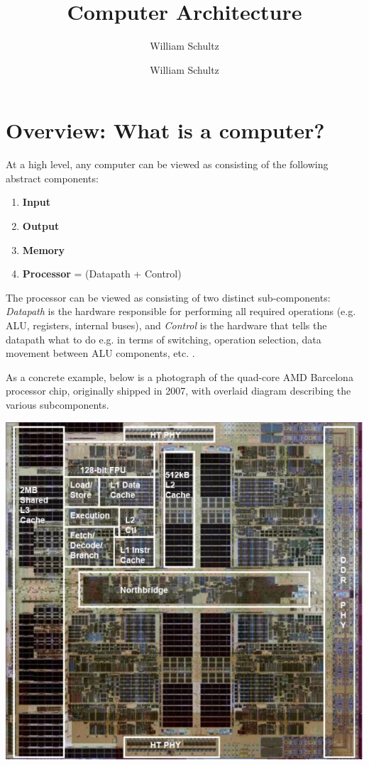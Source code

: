 \documentclass[10pt,a4paper]{article}
\author{William Schultz}
\begin{document}
\title{Computer Architecture}
\author{William Schultz}
\maketitle

\section{Overview: What is a computer?}

At a high level, any computer can be viewed as consisting of the following abstract components:
\begin{enumerate}
    \item \textbf{Input}
    \item \textbf{Output}
    \item \textbf{Memory}
    \item \textbf{Processor} = (Datapath + Control)
\end{enumerate}
The processor can be viewed as consisting of two distinct sub-components: \textit{Datapath} is the hardware responsible for performing all required operations (e.g. ALU, registers, internal buses), and \textit{Control} is the hardware that tells the datapath what to do e.g. in terms of switching, operation selection, data movement between ALU components, etc. \cite{2011fourthcomporgdesign}. 

As a concrete example, below is a photograph of the quad-core AMD Barcelona processor chip, originally shipped in 2007, with overlaid diagram describing the various subcomponents.

\begin{center}
\includegraphics[scale=0.4]{images/amd_barcelona_die.png}
\end{center}
\end{document}
